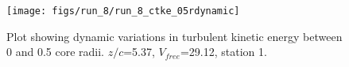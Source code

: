 \begin{figure}[H]
\centering
\texttt{[image: figs/run\_8/run\_8\_ctke\_05rdynamic]}
\caption{Plot showing dynamic variations in turbulent kinetic energy between 0 and 0.5 core radii. $z/c$=5.37, $V_{free}$=29.12, station 1.}
\label{fig:run_8_ctke_05rdynamic}
\end{figure}


